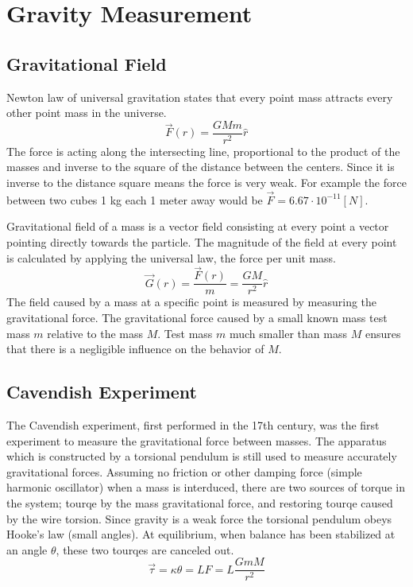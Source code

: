 \documentclass[\main/master.tex]{subfiles}
\begin{document}
\section{Gravity Measurement}

\subsection{Gravitational Field}
Newton law of universal gravitation states that every point mass attracts every other point mass in the universe.
\begin{equation}
\overrightarrow{F}(r) = \frac{GMm}{r^2}\hat{r}    \label{eqn:gravitation_force}
\end{equation} 
The force is acting along the intersecting line, proportional to the product of the masses and inverse to the square of the distance between the centers. Since it is inverse to the distance square means the force is very weak. For example the force between two cubes 1 kg each 1 meter away would be $\overrightarrow{F} = 6.67\cdot10^{-11} [N]$.
\par
Gravitational field of a mass is a vector field consisting at every point a vector pointing directly towards the particle. The magnitude of the field at every point is calculated by applying the universal law, the force per unit mass. 
\begin{equation}
\overrightarrow{G}(r) = \frac{\overrightarrow{F}(r)}{m} = \frac{GM}{r^2}\hat{r}    \label{eqn:gravitation_field}
\end{equation}
The field caused by a mass at a specific point is measured by measuring the gravitational force. The gravitational force caused by a small known mass test mass $m$ relative to the mass $M$. Test mass $m$ much smaller than mass $M$ ensures that there is a negligible influence on the behavior of $M$.  



\subsection{Cavendish Experiment}
The Cavendish experiment, first performed in the 17th century, was the first experiment to measure the gravitational force between masses. The apparatus which is constructed by a torsional pendulum is still used to measure accurately gravitational forces. Assuming no friction or other damping force (simple harmonic oscillator) when a mass is interduced, there are two sources of torque in the system; tourqe by the mass gravitational force, and restoring tourqe caused by the wire torsion. Since gravity is a weak force the torsional pendulum obeys Hooke’s law (small angles). At equilibrium, when balance has been stabilized at an angle $\theta$, these two tourqes are canceled out.
\begin{equation}
\overrightarrow{\tau} = \kappa\theta = LF = L\frac{GmM}{r^2}    \label{eqn:gravitation_tourqe}
\end{equation}
\end{document}
